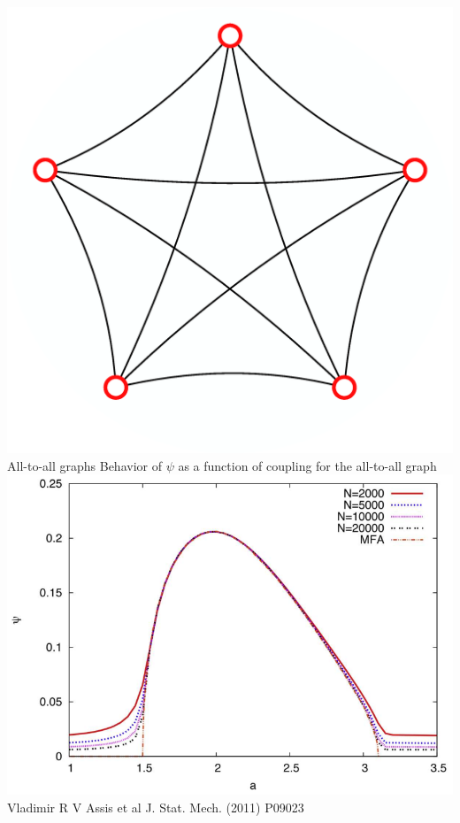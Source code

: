 \documentclass[serif,mathserif]{beamer}
\begin{document}
\begin{frame}{\includegraphics[height=0.06\textheight]{ring-complete-thumb.eps}\hspace{0.25cm} All-to-all graphs}
    \centering
    Behavior of $\psi$ as a function of coupling for the all-to-all graph\\
    \vspace{0.4cm}
    \includegraphics[height=0.7\textheight]{psi-vs-a.eps}\\
    Vladimir R V Assis et al J. Stat. Mech. (2011) P09023
\end{frame}
\end{document}
